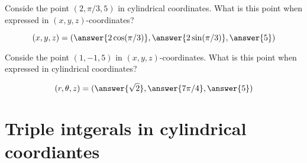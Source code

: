 \documentclass{ximera}
\begin{document}
\begin{question}
  Conside the point $(2, \pi/3,5)$ in cylindrical coordinates. What is
  this point when expressed in $(x,y,z)$-coordinates?
  \begin{prompt}
    \[
    (x,y,z) = (\answer{2\cos(\pi/3)}, \answer{2 \sin(\pi/3)},\answer{5})
    \]
  \end{prompt}
  \begin{question}
    Conside the point $(1, -1,5)$ in $(x,y,z)$-coordinates. What is this
    point when expressed in cylindrical coordinates?
    \begin{prompt}
      \[
      (r,\theta,z) = (\answer{\sqrt{2}}, \answer{7\pi/4},\answer{5})
      \]
    \end{prompt}
  \end{question}
\end{question}

\section{Triple intgerals in cylindrical coordiantes}
\end{document}
